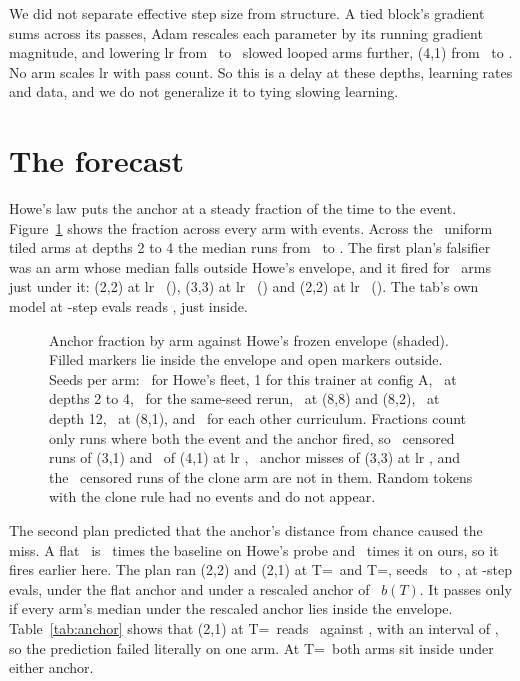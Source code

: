 \documentclass[10pt]{article}
\newcommand{\arm}[2]{(#1,#2)}
\begin{document}
We did not separate effective step size from structure. A tied block's gradient sums across its passes, Adam rescales each parameter by its running gradient magnitude, and lowering lr from \nLrHi\ to \nLrLo\ slowed looped arms further, \arm{4}{1} from \nMedFourOneHi\ to \nMedFourOneLo. No arm scales lr with pass count. So this is a delay at these depths, learning rates and data, and we do not generalize it to tying slowing learning.

\section{The forecast}
\label{sec:forecast}

Howe's law puts the anchor at a steady fraction of the time to the event. Figure~\ref{fig:gap} shows the fraction across every arm with events. Across the \nShallowArms\ uniform tiled arms at depths 2 to 4 the median runs from \nGapShallowLow\ to \nGapShallowHigh. The first plan's falsifier was an arm whose median falls outside Howe's envelope, and it fired for \nArmsOutside\ arms just under it: \arm{2}{2} at lr \nLrHi\ (\nGapTwoTwoHi), \arm{3}{3} at lr \nLrHi\ (\nGapThreeThreeHi) and \arm{2}{2} at lr \nLrLo\ (\nGapTwoTwoLo). The tab's own model at \nEvalEvery-step evals reads \nTabGap, just inside.

\begin{figure}[t]
\centering

\caption{Anchor fraction by arm against Howe's frozen envelope (shaded). Filled markers lie inside the envelope and open markers outside. Seeds per arm: \nHoweSeeds\ for Howe's fleet, 1 for this trainer at config A, \nNTwoTwoHi\ at depths 2 to 4, \nSpacingSeeds\ for the same-seed rerun, \nNEightEightHi\ at \arm{8}{8} and \arm{8}{2}, \nNTwelveFourHi\ at depth 12, \nNEightOneHi\ at \arm{8}{1}, and \nNBiClone\ for each other curriculum. Fractions count only runs where both the event and the anchor fired, so \nCensorThreeOne\ censored runs of \arm{3}{1} and \nCensorFourOne\ of \arm{4}{1} at lr \nLrHi, \nAnchorMissArm\ anchor misses of \arm{3}{3} at lr \nLrLo, and the \nCloneCensored\ censored runs of the clone arm are not in them. Random tokens with the clone rule had no events and do not appear.}
\label{fig:gap}
\end{figure}

The second plan predicted that the anchor's distance from chance caused the miss. A flat \nAnchorThreshold\ is \nMultHigh\ times the baseline on Howe's probe and \nMultLow\ times it on ours, so it fires earlier here. The plan ran \arm{2}{2} and \arm{2}{1} at T=\nStudyT\ and T=\nPlanTwoT, seeds \nPlanTwoSeedLow\ to \nPlanTwoSeedHigh, at \nEvalFine-step evals, under the flat anchor and under a rescaled anchor of \nMultHigh\ $b(T)$. It passes only if every arm's median under the rescaled anchor lies inside the envelope. Table~\ref{tab:anchor} shows that \arm{2}{1} at T=\nStudyT\ reads \nAncRescaledSixtyFourOne\ against \nEnvHigh, with an interval of \nAncMissCi, so the prediction failed literally on one arm. At T=\nPlanTwoT\ both arms sit inside under either anchor.
\end{document}
